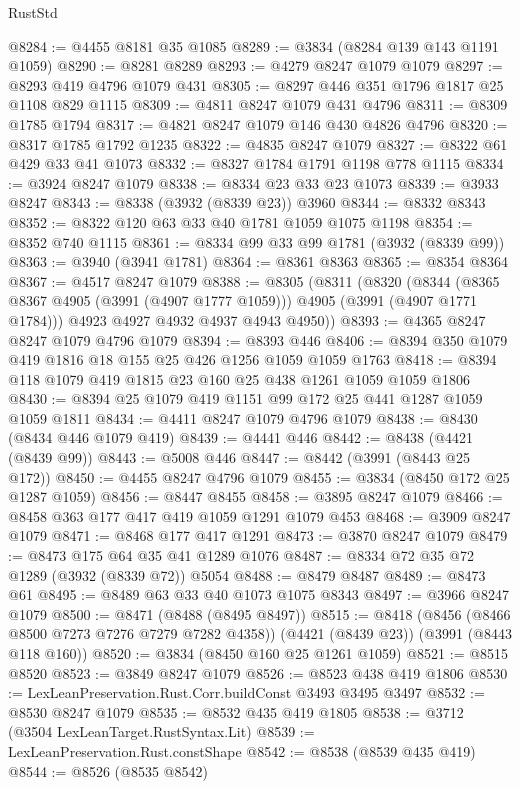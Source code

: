 \begin{lexlean}{RustStd}
\begin{coremodule}
@8284 := @4455 @8181 @35 @1085
@8289 := @3834 (@8284 @139 @143 @1191 @1059)
@8290 := @8281 @8289
@8293 := @4279 @8247 @1079 @1079
@8297 := @8293 @419 @4796 @1079 @431
@8305 := @8297 @446 @351 @1796 @1817 @25 @1108 @829 @1115
@8309 := @4811 @8247 @1079 @431 @4796
@8311 := @8309 @1785 @1794
@8317 := @4821 @8247 @1079 @146 @430 @4826 @4796
@8320 := @8317 @1785 @1792 @1235
@8322 := @4835 @8247 @1079
@8327 := @8322 @61 @429 @33 @41 @1073
@8332 := @8327 @1784 @1791 @1198 @778 @1115
@8334 := @3924 @8247 @1079
@8338 := @8334 @23 @33 @23 @1073
@8339 := @3933 @8247
@8343 := @8338 (@3932 (@8339 @23)) @3960
@8344 := @8332 @8343
@8352 := @8322 @120 @63 @33 @40 @1781 @1059 @1075 @1198
@8354 := @8352 @740 @1115
@8361 := @8334 @99 @33 @99 @1781 (@3932 (@8339 @99))
@8363 := @3940 (@3941 @1781)
@8364 := @8361 @8363
@8365 := @8354 @8364
@8367 := @4517 @8247 @1079
@8388 := @8305
    (@8311
      (@8320
        (@8344 (@8365 @8367 @4905 (@3991 (@4907 @1777 @1059))) @4905 (@3991 (@4907 @1771 @1784)))
        @4923
        @4927
        @4932
        @4937
        @4943
        @4950))
@8393 := @4365 @8247 @8247 @1079 @4796 @1079
@8394 := @8393 @446
@8406 := @8394 @350 @1079 @419 @1816 @18 @155 @25 @426 @1256 @1059 @1059 @1763
@8418 := @8394 @118 @1079 @419 @1815 @23 @160 @25 @438 @1261 @1059 @1059 @1806
@8430 := @8394 @25 @1079 @419 @1151 @99 @172 @25 @441 @1287 @1059 @1059 @1811
@8434 := @4411 @8247 @1079 @4796 @1079
@8438 := @8430 (@8434 @446 @1079 @419)
@8439 := @4441 @446
@8442 := @8438 (@4421 (@8439 @99))
@8443 := @5008 @446
@8447 := @8442 (@3991 (@8443 @25 @172))
@8450 := @4455 @8247 @4796 @1079
@8455 := @3834 (@8450 @172 @25 @1287 @1059)
@8456 := @8447 @8455
@8458 := @3895 @8247 @1079
@8466 := @8458 @363 @177 @417 @419 @1059 @1291 @1079 @453
@8468 := @3909 @8247 @1079
@8471 := @8468 @177 @417 @1291
@8473 := @3870 @8247 @1079
@8479 := @8473 @175 @64 @35 @41 @1289 @1076
@8487 := @8334 @72 @35 @72 @1289 (@3932 (@8339 @72)) @5054
@8488 := @8479 @8487
@8489 := @8473 @61
@8495 := @8489 @63 @33 @40 @1073 @1075 @8343
@8497 := @3966 @8247 @1079
@8500 := @8471 (@8488 (@8495 @8497))
@8515 := @8418
    (@8456 (@8466 @8500 @7273 @7276 @7279 @7282 @4358))
    (@4421 (@8439 @23))
    (@3991 (@8443 @118 @160))
@8520 := @3834 (@8450 @160 @25 @1261 @1059)
@8521 := @8515 @8520
@8523 := @3849 @8247 @1079
@8526 := @8523 @438 @419 @1806
@8530 := LexLeanPreservation.Rust.Corr.buildConst @3493 @3495 @3497
@8532 := @8530 @8247 @1079
@8535 := @8532 @435 @419 @1805
@8538 := @3712 (@3504 LexLeanTarget.RustSyntax.Lit)
@8539 := LexLeanPreservation.Rust.constShape
@8542 := @8538 (@8539 @435 @419)
@8544 := @8526 (@8535 @8542)

\end{coremodule}
\end{lexlean}
